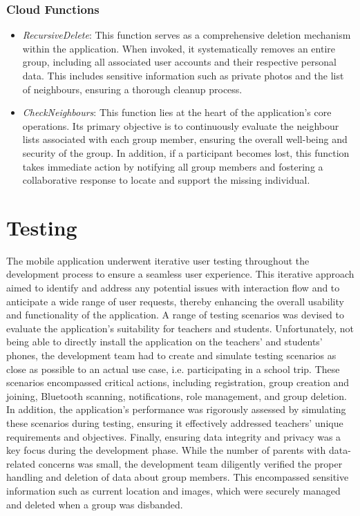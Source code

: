 \subsubsection*{Cloud Functions}
\begin{itemize}
    \item \emph{RecursiveDelete}: This function serves as a comprehensive deletion mechanism within the application. When invoked, it systematically removes an entire group, including all associated user accounts and their respective personal data. This includes sensitive information such as private photos and the list of neighbours, ensuring a thorough cleanup process.
    \item \emph{CheckNeighbours}: This function lies at the heart of the application's core operations. Its primary objective is to continuously evaluate the neighbour lists associated with each group member, ensuring the overall well-being and security of the group. In addition, if a participant becomes lost, this function takes immediate action by notifying all group members and fostering a collaborative response to locate and support the missing individual.
\end{itemize}

\section{Testing}
The mobile application underwent iterative user testing throughout the development process to ensure a seamless user experience. This iterative approach aimed to identify and address any potential issues with interaction flow and to anticipate a wide range of user requests, thereby enhancing the overall usability and functionality of the application.
A range of testing scenarios was devised to evaluate the application's suitability for teachers and students. Unfortunately, not being able to directly install the application on the teachers' and students' phones, the development team had to create and simulate testing scenarios as close as possible to an actual use case, i.e. participating in a school trip. These scenarios encompassed critical actions, including registration, group creation and joining, Bluetooth scanning, notifications, role management, and group deletion. In addition, the application's performance was rigorously assessed by simulating these scenarios during testing, ensuring it effectively addressed teachers' unique requirements and objectives. Finally, ensuring data integrity and privacy was a key focus during the development phase. While the number of parents with data-related concerns was small, the development team diligently verified the proper handling and deletion of data about group members. This encompassed sensitive information such as current location and images, which were securely managed and deleted when a group was disbanded.
